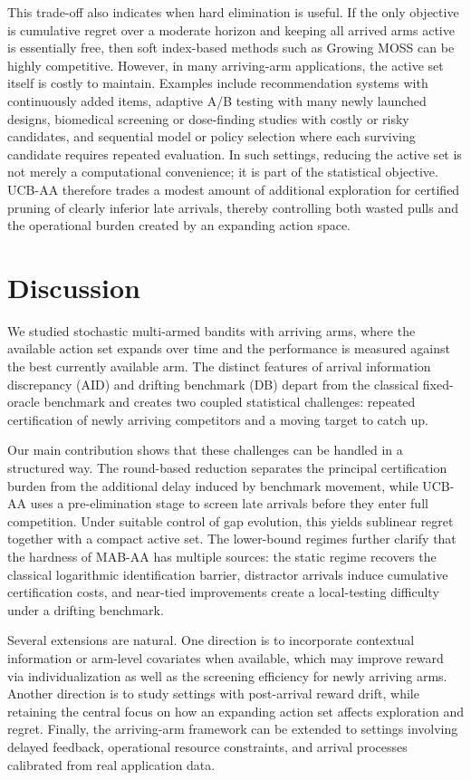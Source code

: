\documentclass[11pt]{article}
\begin{document}
This trade-off also indicates when hard elimination is useful. If the only objective is cumulative
regret over a moderate horizon and keeping all arrived arms active is essentially free, then soft
index-based methods such as Growing MOSS can be highly competitive. However, in many arriving-arm
applications, the active set itself is costly to maintain. Examples include recommendation systems
with continuously added items, adaptive A/B testing with many newly launched designs, biomedical
screening or dose-finding studies with costly or risky candidates, and sequential model or policy
selection where each surviving candidate requires repeated evaluation. In such settings, reducing
the active set is not merely a computational convenience; it is part of the statistical objective.
UCB-AA therefore trades a modest amount of additional exploration for certified pruning of clearly
inferior late arrivals, thereby controlling both wasted pulls and the operational burden created
by an expanding action space.



\section{Discussion}\label{sec:Discussion}


We studied stochastic multi-armed bandits with arriving arms, where the available action
set expands over time and the performance is measured against the best currently available arm. The distinct features of arrival information discrepancy (AID) and drifting benchmark (DB) depart from the classical fixed-oracle benchmark and creates two
coupled statistical challenges: repeated certification of newly arriving competitors and a moving target to catch up.

Our main contribution shows that these challenges can be handled in a structured way. The round-based reduction separates the principal certification burden from the additional delay induced by benchmark movement, while UCB-AA uses a pre-elimination stage to screen late arrivals before they enter full competition. Under suitable control of gap evolution, this yields sublinear regret together with a compact active set. The lower-bound regimes further clarify that the hardness of MAB-AA has multiple sources: the static regime recovers the classical logarithmic identification barrier, distractor arrivals induce cumulative certification costs, and near-tied improvements create a local-testing difficulty under a drifting benchmark.

Several extensions are natural. One direction is to incorporate contextual information or arm-level covariates when  available, which may improve reward via individualization as well as the screening efficiency for newly arriving arms. Another direction is to study settings with post-arrival reward drift, while retaining the central focus on how an expanding action set affects exploration and regret. Finally, the arriving-arm framework can be extended to settings involving delayed feedback, operational resource constraints, and arrival processes calibrated from real application data.

\printbibliography

\end{document}
